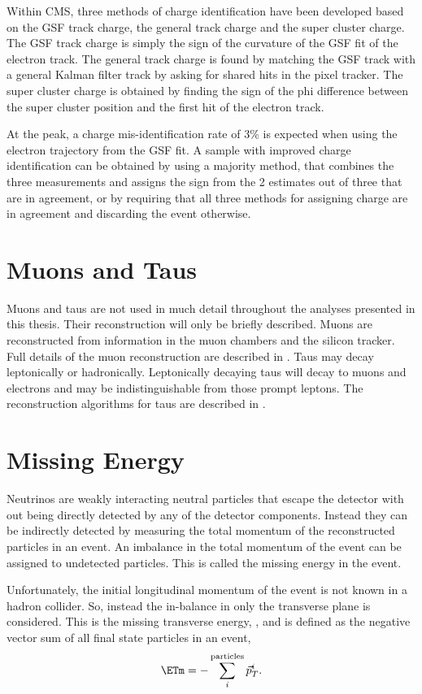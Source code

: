 Within CMS, three methods of charge identification have been developed based on
the GSF track charge, the general track charge and the super cluster charge. The
GSF track charge is simply the sign of the curvature of the GSF fit of the
electron track. The general track charge is found by matching the GSF track with
a general Kalman filter track by asking for shared hits in the pixel tracker. 
The super cluster charge is obtained by finding the sign of the phi difference
between the super cluster position and the first hit of the electron track.

At the \PZ peak, a charge mis-identification rate of \unit{3}{\%} \cite{eReco}
is expected when using the electron trajectory from the GSF fit.  A sample with
improved charge identification can be obtained by using a majority method, that
combines the three measurements and assigns the sign from the 2 estimates out of
three that are in agreement, or by requiring that all three methods for
assigning charge are in agreement and discarding the event otherwise.

\section{Muons and Taus}
Muons and taus are not used in much detail throughout the analyses presented in
this thesis. Their reconstruction will only be briefly described. 
Muons are reconstructed from information in the muon chambers and the silicon
tracker.  Full details of the muon reconstruction are described in \cite{}.
Taus may decay leptonically or hadronically. Leptonically decaying taus will
decay to muons and electrons and may be indistinguishable from those prompt
leptons. The reconstruction algorithms for taus are described in \cite{}.

\section{Missing Energy} 
Neutrinos are weakly interacting neutral particles that escape the
detector with out being directly detected by any of the detector components. 
Instead they can be indirectly detected by measuring the total momentum of the
reconstructed particles in an event.
An imbalance in the total momentum of the event can be assigned to undetected
particles. This is called the missing energy in the event.

Unfortunately, the initial longitudinal momentum of the event is not known in a
hadron collider. So, instead the in-balance in only the transverse plane is
considered. This is the missing transverse energy, \ETm, and is defined as
the negative vector sum of all final state particles in an event,
\begin{equation}
\ETm = -\sum_i^{\text{particles}} \vec{p}_{T}^{i}.
\end{equation}

